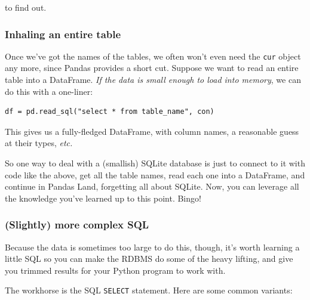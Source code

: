 \documentclass[12pt]{article}
\begin{document}
to find out.

\subsubsection{Inhaling an entire table}

Once we've got the names of the tables, we often won't even need the
\texttt{cur} object any more, since Pandas provides a short cut. Suppose we
want to read an entire table into a DataFrame. \textit{If the data is small
enough to load into memory}, we can do this with a one-liner:

\begin{Verbatim}[fontsize=small,samepage=true,frame=none]
df = pd.read_sql("select * from table_name", con)
\end{Verbatim}

This gives us a fully-fledged DataFrame, with column names, a reasonable guess
at their types, \textit{etc.} 

So one way to deal with a (smallish) SQLite database is just to connect to it
with code like the above, get all the table names, read each one into a
DataFrame, and continue in Pandas Land, forgetting all about SQLite. Now, you
can leverage all the knowledge you've learned up to this point. Bingo!

\subsubsection{(Slightly) more complex SQL}

Because the data is sometimes too large to do this, though, it's worth
learning a little SQL so you can make the RDBMS do some of the heavy lifting,
and give you trimmed results for your Python program to work with.

The workhorse is the SQL \texttt{SELECT} statement. Here are some common
variants:
\end{document}
